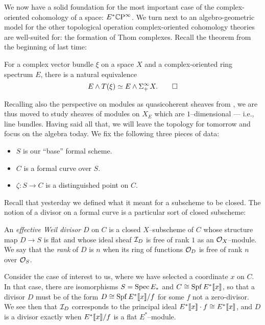 We now have a solid foundation for the most important case of the complex-oriented cohomology of a space: $E^* \mathbb{C}\mathrm P^\infty$.  We turn next to an algebro-geometric model for the other topological operation complex-oriented cohomology theories are well-suited for: the formation of Thom complexes.  Recall the theorem from the beginning of last time:
\begin{theorem}
For a complex vector bundle $\xi$ on a space $X$ and a complex-oriented ring spectrum $E$, there is a natural equivalence \[E \wedge T(\xi) \simeq E \wedge \Sigma^\infty_+ X. \qed\]
\end{theorem}
Recalling also the perspective on modules as quasicoherent sheaves from , we are thus moved to study sheaves of modules on $X_E$ which are $1$--dimensional --- i.e., line bundles.  Having said all that, we will leave the topology for tomorrow and focus on the algebra today.  We fix the following three pieces of data:
\begin{itemize}
\item $S$ is our ``base'' formal scheme.
\item $C$ is a formal curve over $S$.
\item $\zeta: S \to C$ is a distinguished point on $C$.
\end{itemize}

Recall that yesterday we defined what it meant for a subscheme to be closed.  The notion of a divisor on a formal curve is a particular sort of closed subscheme:

\begin{definition}
An \textit{effective Weil divisor} $D$ on $C$ is a closed $X$--subscheme of $C$ whose structure map $D \to S$ is flat and whose ideal sheaf $\mathcal{I}_D$ is free of rank $1$ as an $\mathcal{O}_X$--module.  We say that the \textit{rank} of $D$ is $n$ when its ring of functions $\mathcal{O}_D$ is free of rank $n$ over $\mathcal{O}_S$.
\end{definition}

Consider the case of interest to us, where we have selected a coordinate $x$ on $C$.  In that case, there are isomorphisms $S = \operatorname{Spec} E_*$ and $C \cong \operatorname{Spf} E^*\llbracket{x}\rrbracket$, so that a divisor $D$ must be of the form $D \cong \operatorname{Spf} E^*\llbracket{x}\rrbracket / f$ for some $f$ not a zero-divisor.  We see then that $\mathcal{I}_D$ corresponds to the principal ideal $E^*\llbracket{x}\rrbracket \cdot f \cong E^*\llbracket{x}\rrbracket$, and $D$ is a divisor exactly when $E^*\llbracket{x}\rrbracket / f$ is a flat $E^*$--module.

